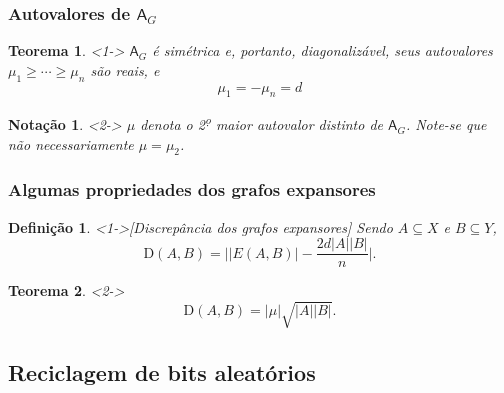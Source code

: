 \documentclass{beamer}
\def\upo{\textsuperscript{\d o}\xspace}
\def\MMD{\mathrm{D}} %
\def\MMp{\mathrm{.}} %
\def\geq{\geqslant} %
\def\matriz#1{\mathsf{#1}}
\theoremstyle{teoaxicorlem}
\newtheorem{Teo}{Teorema}
\theoremstyle{defnotnom}
\newtheorem{Def}{Definição}
\newtheorem{Not}{Notação}
\begin{document}
\begin{frame}
  \frametitle{Autovalores de ${\matriz A}_G$}
  \begin{Teo}<1->
    ${\matriz A}_G$
    é simétrica e, portanto, diagonalizável, seus autovalores
    $\mu_1\geq\dotsb\geq\mu_n$ são reais, e
    \begin{equation*}
      \mu_1 = -\mu_n = d
    \end{equation*}
  \end{Teo}
  \vfill
  \begin{Not}<2->
    $\mu$ denota o 2\upo maior autovalor distinto de ${\matriz
      A}_G$. Note-se que \alert{não necessariamente} $\mu=\mu_2$.
  \end{Not}
\end{frame}

\begin{frame}
  \frametitle{Algumas propriedades dos grafos expansores}
  \begin{Def}<1->[Discrepância dos grafos expansores]
    Sendo $A\subseteq X$ e $B\subseteq Y$,
    \begin{equation*}
      \MMD(A,B) = \biggl||E(A,B)|-\frac{2d|A||B|}{n}\biggr|\MMp
    \end{equation*}
  \end{Def}
  \vfill
  \begin{Teo}<2->
    \begin{equation*}
      \MMD(A,B) = |\mu|\sqrt{|A||B|}\MMp
    \end{equation*}
  \end{Teo}
\end{frame}

\subsection{Reciclagem de bits aleatórios}
\end{document}
